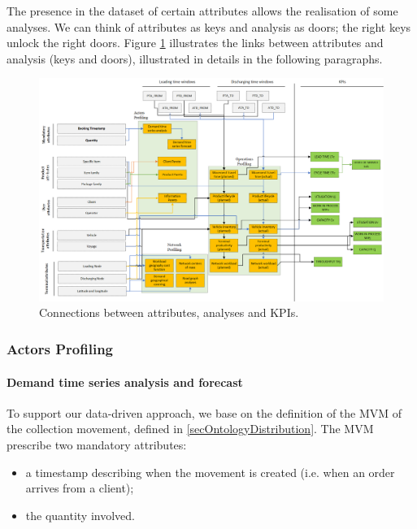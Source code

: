 The presence in the dataset of certain attributes allows the realisation of some analyses. We can think of attributes as keys and analysis as doors; the right keys unlock the right doors. Figure \ref{fig_diagnosisDataDriven} illustrates the links between attributes and analysis (keys and doors), illustrated in details in the following paragraphs.

\begin{landscape}
\thispagestyle{empty}
\begin{figure}[hbt!]
\centering
\includegraphics[width=1.5\textwidth]{SectionDistribution/control_figures/fig_diagnosisDataDriven.png}
\captionsetup{type=figure}
\caption{Connections between attributes, analyses and KPIs.}
\label{fig_diagnosisDataDriven}
\end{figure}
\end{landscape}

\subsubsection{Actors Profiling}

\paragraph{Demand time series analysis and forecast}

To support our data-driven approach, we base on the definition of the MVM of the collection movement, defined in \ref{secOntologyDistribution}. The MVM prescribe two mandatory attributes:

\begin{itemize}
    \item a timestamp describing when the movement is created (i.e. when an order arrives from a client);
    \item the quantity involved.

\end{itemize}

